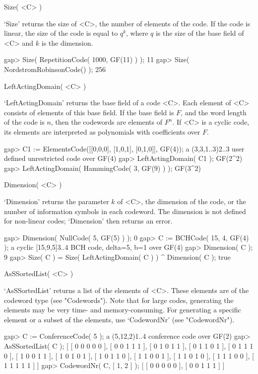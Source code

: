 \>Size( <C> )

`Size'  returns the size of  <C>, the number of elements  of the code. If
the code is linear, the size of the code is equal  to $q^k$, where $q$ is
the size of the base field of <C> and $k$ is the dimension.

\beginexample
gap> Size( RepetitionCode( 1000, GF(11) ) );
11
gap> Size( NordstromRobinsonCode() );
256 
\endexample

\>LeftActingDomain( <C> )

`LeftActingDomain' returns  the  base field  of   a code <C>.  Each   element of <C>
consists  of elements of this base  field. If the base  field is $F$, and
the word  length of the code  is $n$, then the  codewords are elements of
$F^n$.  If <C>   is a  cyclic  code,  its  elements are   interpreted  as
polynomials with coefficients over $F$.

\beginexample
gap> C1 := ElementsCode([[0,0,0], [1,0,1], [0,1,0]], GF(4));
a (3,3,1..3)2..3 user defined unrestricted code over GF(4)
gap> LeftActingDomain( C1 );
GF(2^2)
gap> LeftActingDomain( HammingCode( 3, GF(9) ) );
GF(3^2) 
\endexample

\>Dimension( <C> )

`Dimension' returns the parameter $k$ of <C>,  the dimension of the code,
or the number  of information symbols in  each codeword. The dimension is
not defined for non-linear codes; `Dimension' then returns an error.

\beginexample
gap> Dimension( NullCode( 5, GF(5) ) );
0
gap> C := BCHCode( 15, 4, GF(4) );
a cyclic [15,9,5]3..4 BCH code, delta=5, b=1 over GF(4)
gap> Dimension( C );
9
gap> Size( C ) = Size( LeftActingDomain( C ) ) ^ Dimension( C );
true 
\endexample

\>AsSSortedList( <C> )

`AsSSortedList' returns a  list of the elements of  <C>. These elements are of
the  codeword type   (see   "Codewords"). Note   that for  large   codes,
generating  the   elements may  be very  time-  and memory-consuming. For
generating   a  specific  element  or  a   subset  of  the elements,  use
`CodewordNr' (see "CodewordNr").

\beginexample
gap> C := ConferenceCode( 5 );
a (5,12,2)1..4 conference code over GF(2)
gap> AsSSortedList( C );
[ [ 0 0 0 0 0 ], [ 0 0 1 1 1 ], [ 0 1 0 1 1 ], [ 0 1 1 0 1 ], [ 0 1 1 1 0 ], 
  [ 1 0 0 1 1 ], [ 1 0 1 0 1 ], [ 1 0 1 1 0 ], [ 1 1 0 0 1 ], [ 1 1 0 1 0 ], 
  [ 1 1 1 0 0 ], [ 1 1 1 1 1 ] ]
gap> CodewordNr( C, [ 1, 2 ] );
[ [ 0 0 0 0 0 ], [ 0 0 1 1 1 ] ]
\endexample

